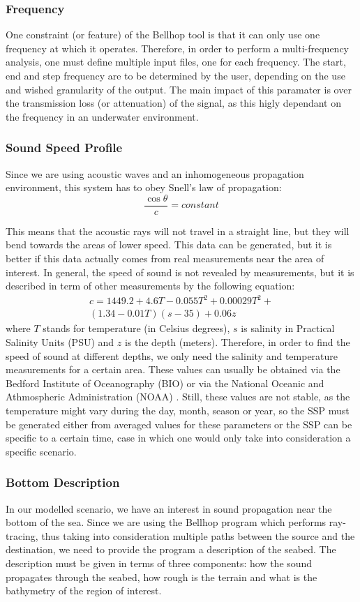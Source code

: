 \documentclass[a4paper]{IEEEtran}
\begin{document}
\subsubsection{Frequency}
One constraint (or feature) of the Bellhop tool is that it can only use one
frequency at which it operates. Therefore, in order to perform a multi-frequency
analysis, one must define multiple input files, one for each frequency. The
start, end and step frequency are to be determined by the user, depending on the
use and wished granularity of the output. The main impact of this paramater is
over the transmission loss (or attenuation) of the signal, as this higly
dependant on the frequency in an underwater environment.

\subsubsection{Sound Speed Profile}
Since we are using acoustic waves and an inhomogeneous propagation environment,
this system has to obey Snell's law of propagation: $$ \frac{\cos{\theta}}{c} =
constant $$

This means that the acoustic rays will not travel in a straight line, but they
will bend towards the areas of lower speed. This data can be generated, but it
is better if this data actually comes from real measurements near the
area of interest. In general, the speed of sound is not revealed by
measurements, but it is described in term of other measurements by the
following equation: 
\begin{eqnarray*}
 c = 1449.2 + 4.6 T - 0.055 T^2 + 0.00029 T^2 +\\
(1.34 - 0.01 T)(s - 35) + 0.06z
\end{eqnarray*}
where $T$ stands for temperature (in Celsius degrees), $s$ is salinity
in Practical Salinity Units (PSU) and $z$ is the depth (meters).
Therefore, in order to find the speed of sound at different depths, we
only need the salinity and temperature measurements for a certain
area. These values can usually be obtained via the Bedford Institute
of Oceanography (BIO) \cite{bio} or via the National Oceanic and
Athmospheric Administration (NOAA) \cite{noaa}. Still, these values
are not stable, as the temperature might vary during the day, month, season or
year, so the SSP must be generated either from averaged values for these
parameters or the SSP can be specific to a certain time, case in which
one would only take into consideration a specific scenario.

\subsubsection{Bottom Description}
In our modelled scenario, we have an interest in sound propagation
near the bottom of the sea. Since we are using the Bellhop program
which performs ray-tracing, thus taking into consideration multiple
paths between the source and the destination, we need to provide the
program a description of the seabed. The description must be given in
terms of three components: how the sound propagates through the
seabed, how rough is the terrain and what is the bathymetry of the
region of interest.
\end{document}
